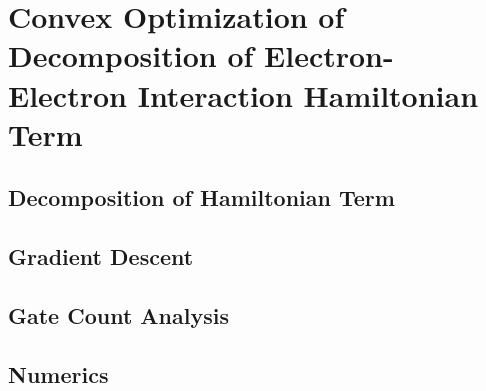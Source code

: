 

\chapter{Convex Optimization of Decomposition of Electron-Electron Interaction Hamiltonian Term}

\section{Decomposition of Hamiltonian Term}
\section{Gradient Descent}
\section{Gate Count Analysis}
\section{Numerics}



